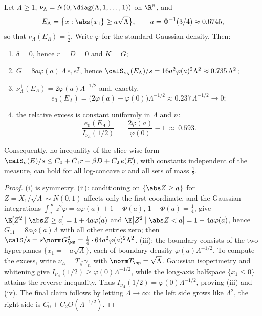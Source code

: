 \documentclass[../../main.tex]{subfiles}
\begin{document}
\begin{proposition}
\label{prop:two-tail}
Let $\Lambda\ge1$, $\nu_\Lambda=N(0,\diag(\Lambda,1,\dots,1))$ on $\R^n$, and
\[
  E_\Lambda=\bigl\{x:\abs{x_1}\ge a\sqrt\Lambda\bigr\},
  \qquad a=\Phi^{-1}(3/4)\approx0.6745,
\]
so that $\nu_\Lambda(E_\Lambda)=\tfrac12$. Write $\varphi$ for the standard Gaussian density.
Then:
\begin{enumerate}[label=(\roman*),leftmargin=2.2em]
\item $\delta=0$, hence $r=D=0$ and $K=G$;
\item $G=8a\varphi(a)\,\Lambda\,e_1e_1^T$, hence
$\calS_{\nu_\Lambda}(E_\Lambda)/s=16a^2\varphi(a)^2\Lambda^2\approx0.735\,\Lambda^2$;
\item $\nu_\Lambda^+(E_\Lambda)=2\varphi(a)\Lambda^{-1/2}$ and, exactly,
\[
  e_0(E_\Lambda)=\bigl(2\varphi(a)-\varphi(0)\bigr)\Lambda^{-1/2}
  \approx0.237\,\Lambda^{-1/2}\to0;
\]
\item the relative excess is constant uniformly in $\Lambda$ and $n$:
\[
  \frac{e_0(E_\Lambda)}{I_{\nu_\Lambda}(1/2)}\ =\ \frac{2\varphi(a)}{\varphi(0)}-1
  \ \approx\ 0.593 .
\]
\end{enumerate}
Consequently, no inequality of the slice-wise form
$\calS_\nu(E)/s\le C_0+C_1r+\beta D+C_2\,e(E)$, with constants independent of the measure, can
hold for all log-concave $\nu$ and all sets of mass $\tfrac12$.
\end{proposition}

\begin{proof}
(i) is symmetry. (ii): conditioning on $\{\abs Z\ge a\}$ for $Z=X_1/\sqrt\Lambda\sim N(0,1)$
affects only the first coordinate, and the Gaussian integrations
$\int_a^\infty z^2\varphi=a\varphi(a)+1-\Phi(a)$, $1-\Phi(a)=\tfrac14$, give
$\E[Z^2\mid\abs Z\ge a]=1+4a\varphi(a)$ and $\E[Z^2\mid\abs Z<a]=1-4a\varphi(a)$, hence
$G_{11}=8a\varphi(a)\Lambda$ with all other entries zero; then
$\calS/s=s\norm G_\HS^2=\tfrac14\cdot64a^2\varphi(a)^2\Lambda^2$. (iii): the boundary consists
of the two hyperplanes $\{x_1=\pm a\sqrt\Lambda\}$, each of boundary density
$\varphi(a)\Lambda^{-1/2}$. To compute the excess, write
$\nu_\Lambda=T_\#\gamma_n$ with $\norm T_\op=\sqrt\Lambda$. Gaussian isoperimetry and
whitening give $I_{\nu_\Lambda}(1/2)\ge\varphi(0)\Lambda^{-1/2}$, while the long-axis
halfspace $\{x_1\le0\}$ attains the reverse inequality. Thus
$I_{\nu_\Lambda}(1/2)=\varphi(0)\Lambda^{-1/2}$, proving (iii) and (iv). The final claim follows by
letting $\Lambda\to\infty$: the left side grows like $\Lambda^2$, the right side is
$C_0+C_2O(\Lambda^{-1/2})$.
\end{proof}
\end{document}

